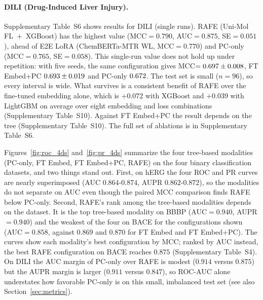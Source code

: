 \documentclass[pdflatex,sn-basic]{sn-jnl}%
\begin{document}
\paragraph{DILI (Drug-Induced Liver Injury).} Supplementary Table~S6 shows results for DILI (single runs). RAFE (Uni-Mol FL~$+$~XGBoost) has the highest value (MCC$=0.790$, AUC$=0.875$, SE$=0.051$), ahead of E2E LoRA (ChemBERTa-MTR WL, MCC$=0.770$) and PC-only (MCC$=0.765$, SE$=0.058$). This single-run value does not hold up under repetition: with five seeds, the same configuration gives MCC$=0.697 \pm 0.008$, FT Embed+PC $0.693 \pm 0.019$ and PC-only $0.672$. The test set is small ($n=96$), so every interval is wide. What survives is a consistent benefit of RAFE over the fine-tuned embedding alone, which is $+0.072$ with XGBoost and $+0.039$ with LightGBM on average over eight embedding and loss combinations (Supplementary Table~S10). Against FT Embed+PC the result depends on the tree (Supplementary Table~S10). The full set of ablations is in Supplementary Table~S6.

Figures~\ref{fig:roc_4ds} and~\ref{fig:pr_4ds} summarize the four tree-based modalities (PC-only, FT Embed, FT Embed+PC, RAFE) on the four binary classification datasets, and two things stand out. First, on hERG the four ROC and PR curves are nearly superimposed (AUC $0.864$-$0.874$, AUPR $0.862$-$0.872$), so the modalities do not separate on AUC even though the paired MCC comparison finds RAFE below PC-only. Second, RAFE's rank among the tree-based modalities depends on the dataset. It is the top tree-based modality on BBBP (AUC$=0.940$, AUPR$=0.940$) and the weakest of the four on BACE for the configurations shown (AUC$=0.858$, against $0.869$ and $0.870$ for FT Embed and FT Embed+PC). The curves show each modality's best configuration by MCC; ranked by AUC instead, the best RAFE configuration on BACE reaches $0.875$ (Supplementary Table~S4). On DILI the AUC margin of PC-only over RAFE is modest ($0.914$ versus $0.875$) but the AUPR margin is larger ($0.911$ versus $0.847$), so ROC-AUC alone understates how favorable PC-only is on this small, imbalanced test set (see also Section~\ref{sec:metrics}).
\end{document}
